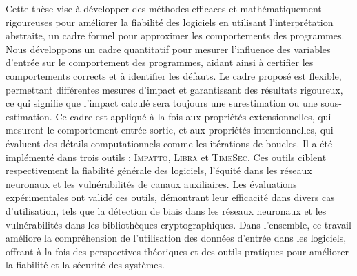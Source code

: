 Cette thèse vise à développer des méthodes efficaces et mathématiquement rigoureuses pour améliorer la fiabilité des logiciels en utilisant l'interprétation abstraite, un cadre formel pour approximer les comportements des programmes. Nous développons un cadre quantitatif pour mesurer l'influence des variables d'entrée sur le comportement des programmes, aidant ainsi à certifier les comportements corrects et à identifier les défauts. Le cadre proposé est flexible, permettant différentes mesures d'impact et garantissant des résultats rigoureux, ce qui signifie que l'impact calculé sera toujours une surestimation ou une sous-estimation.
%
Ce cadre est appliqué à la fois aux propriétés extensionnelles, qui mesurent le comportement entrée-sortie, et aux propriétés intentionnelles, qui évaluent des détails computationnels comme les itérations de boucles. Il a été implémenté dans trois outils : \textsc{Impatto}, \textsc{Libra} et \textsc{TimeSec}. Ces outils ciblent respectivement la fiabilité générale des logiciels, l'équité dans les réseaux neuronaux et les vulnérabilités de canaux auxiliaires. Les évaluations expérimentales ont validé ces outils, démontrant leur efficacité dans divers cas d'utilisation, tels que la détection de biais dans les réseaux neuronaux et les vulnérabilités dans les bibliothèques cryptographiques.
%
Dans l'ensemble, ce travail améliore la compréhension de l'utilisation des données d'entrée dans les logiciels, offrant à la fois des perspectives théoriques et des outils pratiques pour améliorer la fiabilité et la sécurité des systèmes.
